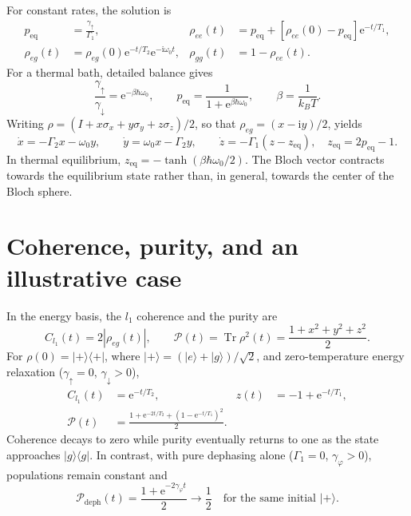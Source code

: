 \documentclass[10pt,a4paper]{article}
\newcommand{\ket}[1]{\lvert #1\rangle}
\newcommand{\bra}[1]{\langle #1\rvert}
\newcommand{\Tr}{\operatorname{Tr}}
\newcommand{\ii}{\mathrm{i}}
\newcommand{\ee}{\mathrm{e}}
\begin{document}
For constant rates, the solution is
\begin{align}
 p_{\mathrm{eq}}&=\frac{\gamma_\uparrow}{\Gamma_1},&
 \rho_{ee}(t)&=p_{\mathrm{eq}}+
 [\rho_{ee}(0)-p_{\mathrm{eq}}]\ee^{-t/T_1},
 \label{eq:population-solution}\\
 \rho_{eg}(t)&=\rho_{eg}(0)\ee^{-t/T_2}\ee^{-\ii\omega_0t},&
 \rho_{gg}(t)&=1-\rho_{ee}(t).
 \label{eq:coherence-solution}
\end{align}
For a thermal bath, detailed balance gives
\begin{equation}
 \frac{\gamma_\uparrow}{\gamma_\downarrow}
 =\ee^{-\beta\hbar\omega_0},\qquad
 p_{\mathrm{eq}}=\frac{1}{1+\ee^{\beta\hbar\omega_0}},\qquad
 \beta=\frac{1}{k_B T}.
 \label{eq:thermal}
\end{equation}
Writing $\rho=(I+x\sigma_x+y\sigma_y+z\sigma_z)/2$, so that
$\rho_{eg}=(x-\ii y)/2$, yields
\begin{equation}
 \dot x=-\Gamma_2x-\omega_0y,\qquad
 \dot y=\omega_0x-\Gamma_2y,\qquad
 \dot z=-\Gamma_1(z-z_{\mathrm{eq}}),\quad
 z_{\mathrm{eq}}=2p_{\mathrm{eq}}-1.
 \label{eq:bloch}
\end{equation}
In thermal equilibrium, $z_{\mathrm{eq}}=-\tanh(\beta\hbar\omega_0/2)$.
The Bloch vector contracts towards the equilibrium state rather than,
in general, towards the center of the Bloch sphere.

\section{Coherence, purity, and an illustrative case}

In the energy basis, the $l_1$ coherence and the purity are
\begin{equation}
 C_{l_1}(t)=2|\rho_{eg}(t)|,\qquad
 \mathcal{P}(t)=\Tr\rho^2(t)=\frac{1+x^2+y^2+z^2}{2}.
 \label{eq:diagnostics}
\end{equation}
For $\rho(0)=\ket{+}\bra{+}$, where
$\ket{+}=(\ket{e}+\ket{g})/\sqrt{2}$, and zero-temperature energy
relaxation ($\gamma_\uparrow=0$, $\gamma_\downarrow>0$),
\begin{align}
 C_{l_1}(t)&=\ee^{-t/T_2},&
 z(t)&=-1+\ee^{-t/T_1},\label{eq:plus-state}\\
 \mathcal{P}(t)&=\frac{1+\ee^{-2t/T_2}
 +(1-\ee^{-t/T_1})^2}{2}.
 \label{eq:purity}
\end{align}
Coherence decays to zero while purity eventually returns to one as the
state approaches $\ket{g}\bra{g}$. In contrast, with pure dephasing
alone ($\Gamma_1=0$, $\gamma_\varphi>0$), populations remain constant and
\begin{equation}
 \mathcal{P}_{\mathrm{deph}}(t)
 =\frac{1+\ee^{-2\gamma_\varphi t}}{2}
 \longrightarrow\frac{1}{2}
 \quad\text{for the same initial }\ket{+}.
 \label{eq:pure-dephasing}
\end{equation}
\end{document}
